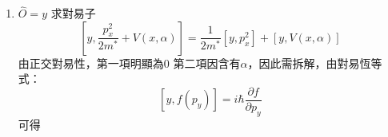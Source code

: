 \documentclass[12pt]{article}
\begin{document}
\begin{enumerate}
因此
\begin{equation}
    [p_x,V(x,\alpha)]=-i\hbar \frac{\partial V}{\partial x}
\end{equation}
把微分項算出：
\[\frac{\partial V}{\partial x}=\frac{\partial}{\partial x}\left(\frac{1}{2}m^*\alpha^2 + \frac12m^*\alpha\beta x^2 + \frac18m^*\beta^2 x^4\right)=m^*\alpha\beta x+\frac12m^*\beta^2 x^3\]
得到
\begin{equation}
    [p_x,V(x,\alpha)]=-i\hbar m^*\left(\alpha\beta x+\frac12\beta^2 x^3\right)
\end{equation}
因此
\begin{equation}
    [p_x,H]=-i\hbar m^*\left(\alpha\beta x+\frac12\beta^2 x^3\right)
\end{equation}
帶回 Ehrenfest thrm，得：
\begin{align}
    &\frac{d\langle\hat{p}_x\rangle}{dt}=\frac{1}{i\hbar}\cdot(-i\hbar m^*)\left\langle\alpha\beta x+\frac12\beta^2 x^3\right\rangle=-m^*\left\langle\alpha\beta x+\frac12\beta^2 x^3\right\rangle\nonumber \\
    &\to\frac{d\langle\hat{p}_x\rangle}{dt}=-m^*\alpha\beta\langle x\rangle-\frac12m^*\beta^2\langle x^3\rangle
\end{align}
量子化：
\begin{equation}
    \frac{d\langle\hat{p}_x\rangle_n}{dt}=-m^*\alpha\beta\langle x\rangle_n-\frac12m^*\beta^2\langle x^3\rangle_n
\end{equation}
帶入式\eqref{39}，得到：
\begin{equation}
    \frac{d}{dt}\left(m^*\frac{d\langle x\rangle_n}{dt}\right)=-m^*\alpha\beta\langle x\rangle_n-\frac12m^*\beta^2\langle x^3\rangle_n
\end{equation}
同除$m^*$：
\begin{equation}
    \frac{d^2\langle x\rangle_n}{dt^2}=-\alpha\beta\langle x\rangle_n-\frac12\beta^2\langle x^3\rangle_n\label{47}
\end{equation}
洽對應式\eqref{17}
    \item $\hat{O}=y$
\newline\noindent
求對易子
\begin{equation*}
    \left[y,\frac{p_x^2}{2m^*}+V(x,\alpha)\right]=\frac{1}{2m^*}\left[y,p_x^2\right]+\left[y,V(x,\alpha)\right]
\end{equation*}
由正交對易性，第一項明顯為0
\newline\noindent
第二項因含有$\alpha$，因此需拆解，由對易恆等式：
\[[y,f(p_y)]=i\hbar\frac{\partial f}{\partial p_y}\]
可得
\begin{align}

\end{align}
\end{enumerate}
\end{document}
